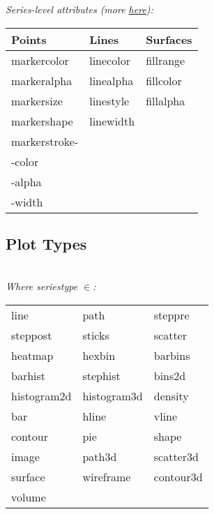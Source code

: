 \textit{Series-level attributes (more \href{https://docs.juliaplots.org/latest/generated/attributes\_series/}{here}):}\\
{\scriptsize
\begin{tabular}{l l l}
    Points                  & Lines          & Surfaces \\ \hline
    markercolor             & linecolor     & fillrange \\
    markeralpha             & linealpha     & fillcolor \\
    markersize              & linestyle     & fillalpha \\
    markershape             & linewidth     & \\
    markerstroke-           & \\
    \phantom{xxxx}-color    & \\
    \phantom{xxxx}-alpha    & \\
    \phantom{xxxx}-width    & \\
\end{tabular}
}

\subsection*{Plot Types}
 \\
\textit{Where seriestype $\in$:}\\
{\scriptsize
\begin{tabular}{l l l}
    line        & path          & steppre \\
    steppost    & sticks        & scatter \\
    heatmap     & hexbin        & barbins \\
    barhist     & stephist      & bins2d \\
    histogram2d & histogram3d   & density \\
    bar         & hline         & vline \\
    contour     & pie           & shape \\
    image       & path3d        & scatter3d \\
    surface     & wireframe     & contour3d \\
    volume  \\
\end{tabular}
}


